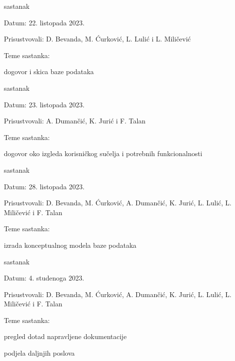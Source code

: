 \begin{packed_enum}
            \item  sastanak
			\item[] \begin{packed_item}
				\item Datum: 22. listopada 2023.
				\item Prisustvovali: D. Bevanda, M. Ćurković, L. Lulić i L. Miličević 
				\item Teme sastanka:
				\begin{packed_item}
					\item  dogovor i skica baze podataka
				\end{packed_item}
			\end{packed_item}

            \item  sastanak
			\item[] \begin{packed_item}
				\item Datum: 23. listopada 2023.
				\item Prisustvovali: A. Dumančić, K. Jurić i F. Talan
				\item Teme sastanka:
				\begin{packed_item}
					\item  dogovor oko izgleda korisničkog sučelja i potrebnih funkcionalnosti
				\end{packed_item}
			\end{packed_item}

            \item  sastanak
			\item[] \begin{packed_item}
				\item Datum: 28. listopada 2023.
				\item Prisustvovali: D. Bevanda, M. Ćurković, A. Dumančić, K. Jurić, L. Lulić, L. Miličević i F. Talan
				\item Teme sastanka:
				\begin{packed_item}
					\item  izrada konceptualnog modela baze podataka
				\end{packed_item}
			\end{packed_item}

			\item  sastanak
			\item[] \begin{packed_item}
				\item Datum: 4. studenoga 2023.
				\item Prisustvovali: D. Bevanda, M. Ćurković, A. Dumančić, K. Jurić, L. Lulić, L. Miličević i F. Talan
				\item Teme sastanka:
				\begin{packed_item}
					\item  pregled dotad napravljene dokumentacije
                    			\item  podjela daljnjih poslova
				\end{packed_item}
			\end{packed_item}


\end{packed_enum}
